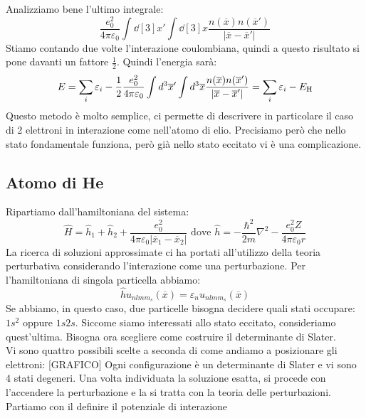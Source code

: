 Analizziamo bene l'ultimo integrale:
\begin{equation*}
    \frac{e_0^2}{4\pi\varepsilon_0}\int \dd[3]{x'} \int \dd[3]{x} \frac{n(\overline x)n(\overline{x}')}{|\overline x - \overline{x}'|}
\end{equation*}
Stiamo contando due volte l'interazione coulombiana, quindi a questo risultato si pone davanti un fattore $\frac 12$. Quindi l'energia sarà:
\begin{equation*}
    E=\sum_i\varepsilon_i - \frac 12 \frac{e_0^2}{4\pi\varepsilon_0}\int d^3 \overline x'\int d^3 \overline x \frac{n(\overline x)n(\overline{x}')}{|\overline x - \overline{x}'|} = \sum_i\varepsilon_i - E_{\text H}
\end{equation*}
Questo metodo è molto semplice, ci permette di descrivere in particolare il caso di 2 elettroni in interazione come nell'atomo di elio. Precisiamo però che nello stato fondamentale funziona, però già nello stato eccitato vi è una complicazione.
\subsection{Atomo di He}
Ripartiamo dall'hamiltoniana del sistema:
\begin{equation*}
    \hat H = \hat h_1 + \hat h_2 + \frac{e_0^2}{4\pi\varepsilon_0 |\overline{x}_1-\overline{x}_2|} \text{   dove   } \hat h = -\frac{\hbar^2}{2m}\nabla^2-\frac{e_0^2 Z}{4\pi\varepsilon_0 r}
\end{equation*}
La ricerca di soluzioni approssimate ci ha portati all'utilizzo della teoria perturbativa considerando l'interazione come una perturbazione. Per l'hamiltoniana di singola particella abbiamo:
\begin{equation*}
    \hat h u_{nlmm_s}(\overline x)=\varepsilon_nu_{nlmm_s}(\overline x)
\end{equation*}
Se abbiamo, in questo caso, due particelle bisogna decidere quali stati occupare: $1s^2$ oppure $1s2s$. Siccome siamo interessati allo stato eccitato, consideriamo quest'ultima. Bisogna ora scegliere come costruire il determinante di Slater.\\

Vi sono quattro possibili scelte a seconda di come andiamo a posizionare gli elettroni:
[GRAFICO]
Ogni configurazione è un determinante di Slater e vi sono 4 stati degeneri. Una volta individuata la soluzione esatta, si procede con l'accendere la perturbazione e la si tratta con la teoria delle perturbazioni. Partiamo con il definire il potenziale di interazione

